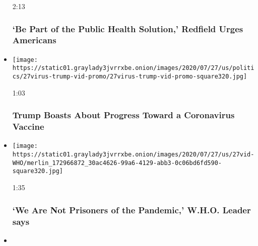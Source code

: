 \begin{itemize}
  2:13

  \hypertarget{be-part-of-the-public-health-solution-redfield-urges-americans}{%
  \subsubsection{`Be Part of the Public Health Solution,' Redfield Urges
  Americans}\label{be-part-of-the-public-health-solution-redfield-urges-americans}}
\item
  \href{https://www.nytimes3xbfgragh.onion/video/us/100000007258794/trump-boasts-vaccine-progress-north-carolina.html?action=click\&module=video-series-bar\&region=header\&pgtype=Article\&playlistId=video/coronavirus-news-update}{}

  \texttt{[image: https://static01.graylady3jvrrxbe.onion/images/2020/07/27/us/politics/27virus-trump-vid-promo/27virus-trump-vid-promo-square320.jpg]}

  1:03

  \hypertarget{trump-boasts-about-progress-toward-a-coronavirus-vaccine}{%
  \subsubsection{Trump Boasts About Progress Toward a Coronavirus
  Vaccine}\label{trump-boasts-about-progress-toward-a-coronavirus-vaccine}}
\item
  \href{https://www.nytimes3xbfgragh.onion/video/world/100000007258544/who-pandemic-response.html?action=click\&module=video-series-bar\&region=header\&pgtype=Article\&playlistId=video/coronavirus-news-update}{}

  \texttt{[image: https://static01.graylady3jvrrxbe.onion/images/2020/07/27/us/27vid-WHO/merlin\_172966872\_30ac4626-99a6-4129-abb3-0c06bd6fd590-square320.jpg]}

  1:35

  \hypertarget{we-are-not-prisoners-of-the-pandemic-who-leader-says}{%
  \subsubsection{`We Are Not Prisoners of the Pandemic,' W.H.O. Leader
  says}\label{we-are-not-prisoners-of-the-pandemic-who-leader-says}}
\item
  \href{https://www.nytimes3xbfgragh.onion/video/us/100000007253343/coronavirus-houston-family.html?action=click\&module=video-series-bar\&region=header\&pgtype=Article\&playlistId=video/coronavirus-news-update}{}


\end{itemize}
